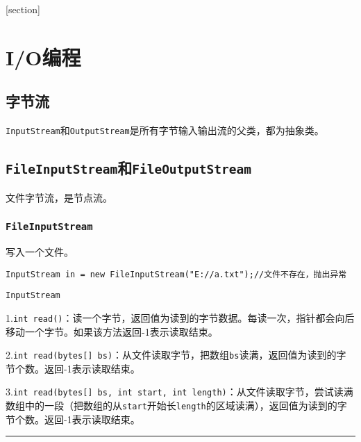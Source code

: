 \documentclass[a4paper]{report}
\begin{document}
\flushbottom%
\newcommand{\dm}[1]{\colorbox{wgray}{\lstinline`#1`}}
\newcommand{\myroman}[1]{\uppercase\expandafter{\romannumeral#1}}
[section] \renewcommand{\thenum}{\arabic{num}.} \newcommand{\num}{\refstepcounter{num}\text{\thenum}}

\newenvironment{tips}{\kaishu\zihao{-6}\color{blue}{\noindent\rule[-3pt]{\textwidth}{0.5pt}\par \em \noindent {\zihao{-5} \textcolor[rgb]{1.00,0.00,0.00}{Tips}}}\par}{\\ \rule[3mm]{\textwidth}{0.5pt}\par}

\newenvironment{zhengming}{\kaishu\zihao{-5}\color{blue}{\noindent\em 证明：}\par}{\hfill $\diamondsuit$\par}

\tableofcontents
{}%
\clearpage
{}%

\chapter{I/O编程}
\section{字节流}
\dm{InputStream}和\dm{OutputStream}是所有字节输入输出流的父类，都为抽象类。
\section{\dm{FileInputStream}和\dm{FileOutputStream}}
文件字节流，是节点流。
\subsection{\dm{FileInputStream}}
写入一个文件。
\begin{lstlisting}
InputStream in = new FileInputStream("E://a.txt");//文件不存在，抛出异常
\end{lstlisting}
\begin{tips}
\dm{InputStream}

1.\dm{int read()}：读一个字节，返回值为读到的字节数据。每读一次，指针都会向后移动一个字节。如果该方法返回-1表示读取结束。

2.\dm{int read(bytes[] bs)}：从文件读取字节，把数组\dm{bs}读满，返回值为读到的字节个数。返回-1表示读取结束。

3.\dm{int read(bytes[] bs, int start, int length)}：从文件读取字节，尝试读满数组中的一段（把数组的从\dm{start}开始长\dm{length}的区域读满），返回值为读到的字节个数。返回-1表示读取结束。
\end{tips}
\end{document}
